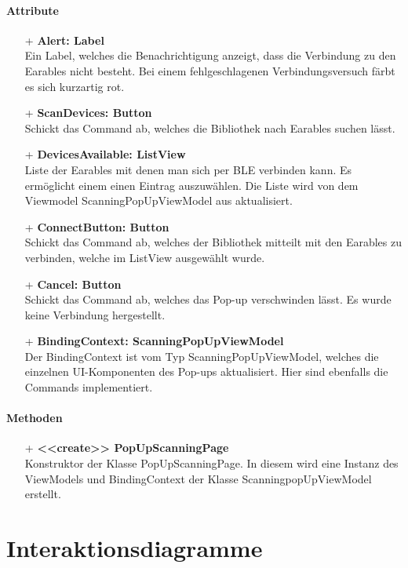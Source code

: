 \documentclass[a4paper,12pt]{article}
\begin{document}
		\paragraph{Attribute}
		\begin{itemize}
		\item[+] \textbf{Alert: Label}\\Ein Label, welches die Benachrichtigung anzeigt, dass die Verbindung zu den \gls{Earables} nicht besteht. Bei einem fehlgeschlagenen Verbindungsversuch färbt es sich kurzartig rot.
		\item[+] \textbf{ScanDevices: Button}\\Schickt das Command ab, welches die Bibliothek nach \gls{Earables} suchen lässt.
		\item[+] \textbf{DevicesAvailable: ListView}\\Liste der \Gls{Earables} mit denen man sich per \gls{BLE} verbinden kann. Es ermöglicht einem einen Eintrag auszuwählen. Die Liste wird von dem Viewmodel ScanningPopUpViewModel aus aktualisiert.
		\item[+] \textbf{ConnectButton: Button}\\Schickt das Command ab, welches der Bibliothek mitteilt mit den \Gls{Earables} zu verbinden, welche im ListView ausgewählt wurde.
		\item[+] \textbf{Cancel: Button}\\Schickt das Command ab, welches das Pop-up verschwinden lässt. Es wurde keine Verbindung hergestellt.
		\item[+] \textbf{BindingContext: ScanningPopUpViewModel}\\Der BindingContext ist vom Typ ScanningPopUpViewModel, welches die einzelnen UI-Komponenten des Pop-ups aktualisiert. Hier sind ebenfalls die Commands implementiert.
		\end{itemize}
		
		\paragraph{Methoden}
		\begin{itemize}
		\item[+] \textbf{<<create>> PopUpScanningPage}\\Konstruktor der Klasse PopUpScanningPage. In diesem wird eine Instanz des ViewModels und BindingContext der Klasse ScanningpopUpViewModel erstellt.
		\end{itemize}

\section{Interaktionsdiagramme}
\end{document}
